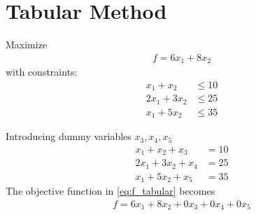 \documentclass[journal,12pt,twocolumn]{IEEEtran}
\begin{document}
\section{Tabular Method}
\begin{problem}
Maximize
\begin{align}
f = 6x_1 + 8x_2
\label{eq:f_tabular}
\end{align}
with constraints:
\begin{align}
x_1 + x_2 &\leq 10\\
2x_1 + 3x_2 &\leq 25\\
x_1 + 5x_2 &\leq 35
\end{align}
\end{problem}
\solution
Introducing dummy variables $x_3,x_4,x_5$
\begin{align}
x_1 + x_2 + x_3 &= 10\\
2x_1 + 3x_2 + x_4 &=25\\
x_1 + 5x_2 + x_5 &= 35
\end{align}
The objective function in \eqref{eq:f_tabular}  becomes
\begin{align}
\label{eq:f_x1-5}
f = 6x_1 + 8x_2 + 0x_3 + 0x_4 + 0x_5
\end{align}
\end{document}
